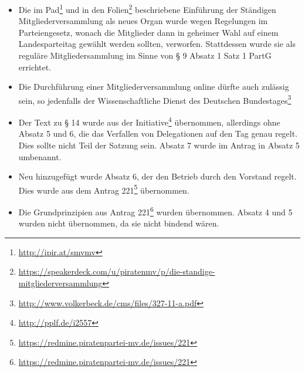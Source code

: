 \begin{itemize}
\item
  Die im Pad\footnote{\url{http://ipir.at/smvmv}} und in den Folien\footnote{\url{https://speakerdeck.com/u/piratenmv/p/die-standige-mitgliederversammlung}} beschriebene Einführung der Ständigen Mitgliederversammlung als neues Organ wurde wegen Regelungen im Parteiengesetz, wonach die Mitglieder dann in geheimer Wahl auf einem Landesparteitag gewählt werden sollten, verworfen. Stattdessen wurde sie als reguläre Mitgliedersammlung im Sinne von § 9 Absatz 1 Satz 1 PartG errichtet.
\item
  Die Durchführung einer Mitgliederversammlung online dürfte auch zulässig sein, so jedenfalls der Wissenschaftliche Dienst des Deutschen Bundestages\footnote{\url{http://www.volkerbeck.de/cms/files/327-11-a.pdf}}
\item
  Der Text zu § 14 wurde aus der Initiative\footnote{\url{http://pplf.de/i2557}} übernommen, allerdings ohne Absatz 5 und 6, die das Verfallen von Delegationen auf den Tag genau regelt. Dies sollte nicht Teil der Satzung sein. Absatz 7 wurde im Antrag in Absatz 5 umbenannt.
\item
  Neu hinzugefügt wurde Absatz 6, der den Betrieb durch den Vorstand regelt. Dies wurde aus dem Antrag 221\footnote{\url{https://redmine.piratenpartei-mv.de/issues/221}} übernommen.
\item
  Die Grundprinzipien aus Antrag 221\footnote{\url{https://redmine.piratenpartei-mv.de/issues/221}} wurden übernommen. Absatz 4 und 5 wurden nicht übernommen, da sie nicht bindend wären.
\end{itemize}
